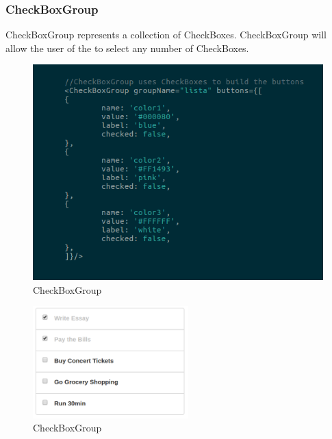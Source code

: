 \subsubsection{CheckBoxGroup}
CheckBoxGroup represents a collection of CheckBoxes.
CheckBoxGroup will allow the user of the  to select any number of CheckBoxes.
\begin{figure}[H]
	\centering
	\includegraphics[width=14cm]{../../documenti/UserManualFramework/framework_view/10framework_view_check_group.png}
	\caption{CheckBoxGroup}
\end{figure}

\begin{figure}[H]
	\centering
	\includegraphics[width=6cm]{../../documenti/UserManualFramework/graphical_elements/checkBoxGroupGE.png}
	\caption{CheckBoxGroup}
\end{figure}

